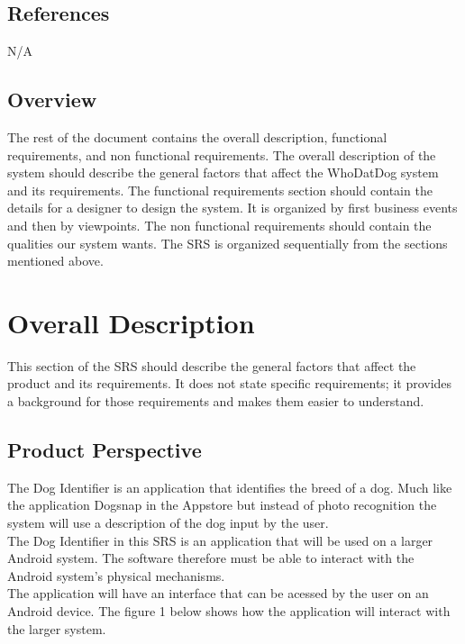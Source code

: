 \documentclass[]{article}
\begin{document}

\subsection{References}
N/A

\subsection{Overview}
\label{sub:overview}
The rest of the document contains the overall description, functional requirements, and non functional requirements. The overall description of the system should describe the general factors that affect the WhoDatDog system and its requirements. The functional requirements section should contain the details for a designer to design the system. It is organized by first business events and then by viewpoints. The non functional requirements should contain the qualities our system wants. The SRS is organized sequentially from the sections mentioned above. 
\section{Overall Description}
\label{sec:overall_description}

This section of the SRS should describe the general factors that affect the product and its requirements. It does not state specific requirements; it provides a background for those requirements and makes them easier to understand.

\subsection{Product Perspective}
\label{sub:product_perspective}
The Dog Identifier is an application that identifies the breed of a dog. Much like the application Dogsnap in the Appstore but instead of photo recognition the system will use a description of the dog input by the user.\\

The Dog Identifier in this SRS is an application that will be used on a larger Android system. The software therefore must be able to interact with the Android system's physical mechanisms.\\

The application will have an interface that can be acessed by the user on an Android device. The figure 1 below shows how the application will interact with the larger system.
\end{document}
